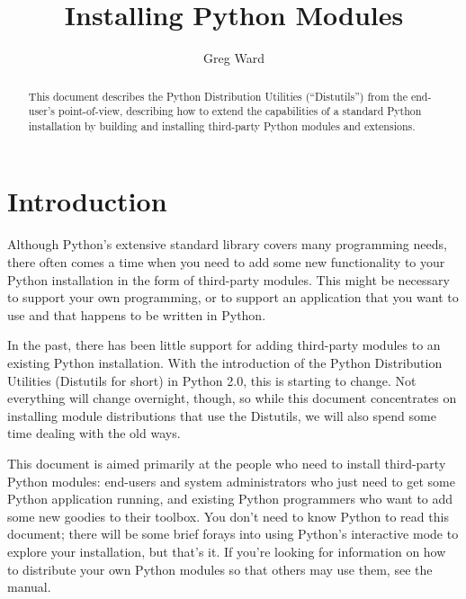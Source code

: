 \documentclass{howto}
\title{Installing Python Modules}
\author{Greg Ward}
\begin{document}
\maketitle

\begin{abstract}
  \noindent
  This document describes the Python Distribution Utilities
  (``Distutils'') from the end-user's point-of-view, describing how to
  extend the capabilities of a standard Python installation by building
  and installing third-party Python modules and extensions.
\end{abstract}



%
\tableofcontents


\section{Introduction}
\label{intro}

Although Python's extensive standard library covers many programming
needs, there often comes a time when you need to add some new
functionality to your Python installation in the form of third-party
modules.  This might be necessary to support your own programming, or to
support an application that you want to use and that happens to be
written in Python.

In the past, there has been little support for adding third-party
modules to an existing Python installation.  With the introduction of
the Python Distribution Utilities (Distutils for short) in Python 2.0,
this is starting to change.  Not everything will change overnight,
though, so while this document concentrates on installing module
distributions that use the Distutils, we will also spend some time
dealing with the old ways.

This document is aimed primarily at the people who need to install
third-party Python modules: end-users and system administrators who just
need to get some Python application running, and existing Python
programmers who want to add some new goodies to their toolbox.  You
don't need to know Python to read this document; there will be some
brief forays into using Python's interactive mode to explore your
installation, but that's it.  If you're looking for information on how
to distribute your own Python modules so that others may use them, see
the  manual.
\end{document}
